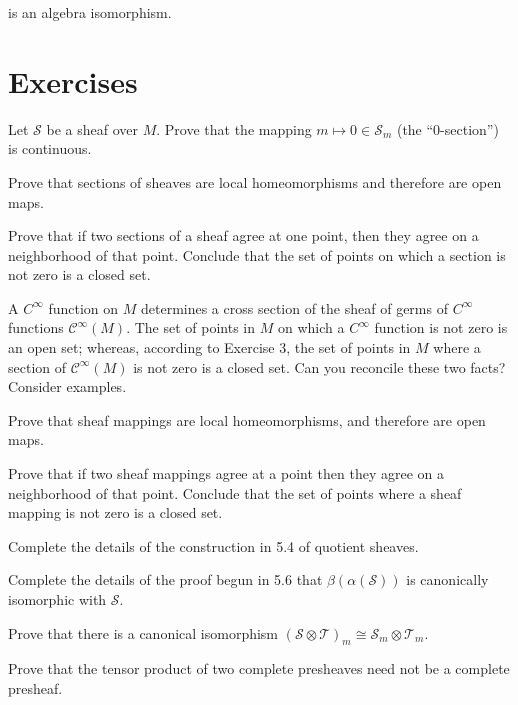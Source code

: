 is an algebra isomorphism.

\section{Exercises}

\begin{problemset}

\item Let $\mathcal{S}$ be a sheaf over $M$. Prove that the mapping  $ m \mapsto 0 \in \mathcal{S}_m $ (the “0-section”) is continuous.

\item Prove that sections of sheaves are local homeomorphisms and therefore are open maps.

\item Prove that if two sections of a sheaf agree at one point, then they agree on a neighborhood of that point. Conclude that the set of points on which a section is not zero is a closed set.

\item A $C^{\infty}$ function on $M$ determines a cross section of the sheaf of germs of $C^{\infty}$ functions $\mathcal{C}^{\infty}(M)$. The set of points in $M$ on which a $C^{\infty}$ function is not zero is an open set; whereas, according to Exercise 3, the set of points in $M$ where a section of $\mathcal{C}^{\infty}(M)$ is not zero is a closed set. Can you reconcile these two facts? Consider examples.

\item Prove that sheaf mappings are local homeomorphisms, and therefore are open maps.

\item Prove that if two sheaf mappings agree at a point then they agree on a neighborhood of that point. Conclude that the set of points where a sheaf mapping is not zero is a closed set.

\item Complete the details of the construction in 5.4 of quotient sheaves.

\item Complete the details of the proof begun in 5.6 that $\beta(\alpha(\mathcal{S}))$ is canonically isomorphic with $\mathcal{S}$.

\item Prove that there is a canonical isomorphism $(\mathcal{S}\otimes\mathcal{T})_{m}\cong\mathcal{S}_{m}\otimes\mathcal{T}_{m}$.

\item Prove that the tensor product of two complete presheaves need not be a complete presheaf.


\end{problemset}
